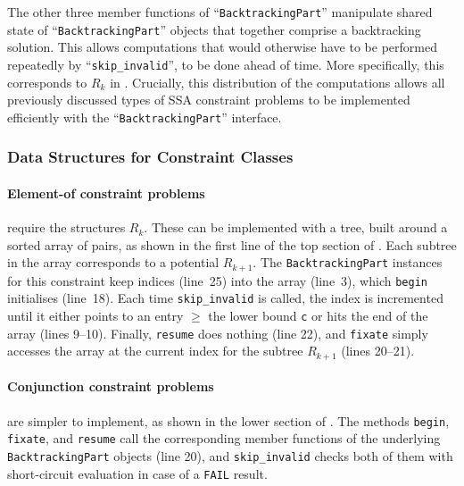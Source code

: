     The other three member functions of
    ``\texttt{BacktrackingPart}'' manipulate shared state
    of ``\texttt{BacktrackingPart}'' objects that together
    comprise a backtracking solution.
    This allows computations that would otherwise have to be performed
    repeatedly by ``\texttt{skip\_invalid}'', to be done ahead of time.
    More specifically, this corresponds to $R_k$ in
    .
    Crucially, this distribution of the computations allows all previously
    discussed types of SSA constraint problems to be implemented efficiently
    with the ``\texttt{BacktrackingPart}'' interface.

\subsubsection{Data Structures for Constraint Classes}

    \paragraph*{Element-of constraint problems} require the structures $R_k$.
    These can be implemented with a tree, built around a sorted array of pairs,
    as shown in the first line of the top section of .
    Each subtree in the array corresponds to a potential $R_{k+1}$.
    The {\tt BacktrackingPart} instances for this constraint keep indices
    (line~25) into
    the array (line~3), which {\tt begin} initialises (line~18).
    Each time {\tt skip\_invalid} is called, the index is incremented until
    it either points to an entry $\geq$ the lower bound {\tt c} or hits the
    end of the array (lines 9--10).
    Finally, {\tt resume} does nothing (line 22), and {\tt fixate} simply
    accesses the array at the current index for the subtree $R_{k+1}$
    (lines 20--21).

    \paragraph*{Conjunction constraint problems} are simpler to implement, as
    shown in the lower section of .
    The methods {\tt begin}, {\tt fixate}, and {\tt resume} call the
    corresponding member functions of the underlying {\tt BacktrackingPart}
    objects (line 20), and \texttt{skip\_invalid} checks both of them with
    short-circuit evaluation in case of a {\tt FAIL} result.

